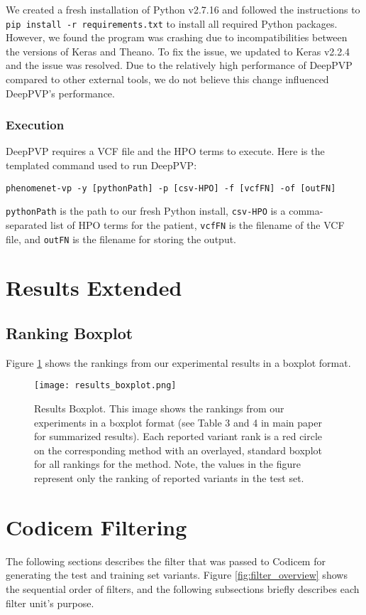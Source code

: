 \documentclass{article}
\begin{document}
We created a fresh installation of Python v2.7.16 and followed the instructions to \texttt{pip install -r requirements.txt} to install all required Python packages. However, we found the program was crashing due to incompatibilities between the versions of Keras and Theano.  To fix the issue, we updated to Keras v2.2.4 and the issue was resolved.  Due to the relatively high performance of DeepPVP compared to other external tools, we do not believe this change influenced DeepPVP's performance.

\subsubsection{Execution}
DeepPVP requires a VCF file and the HPO terms to execute.  Here is the templated command used to run DeepPVP:

\begin{verbatim}
phenomenet-vp -y [pythonPath] -p [csv-HPO] -f [vcfFN] -of [outFN]
\end{verbatim}

\texttt{pythonPath} is the path to our fresh Python install, \texttt{csv-HPO} is a comma-separated list of HPO terms for the patient, \texttt{vcfFN} is the filename of the VCF file, and \texttt{outFN} is the filename for storing the output.

\pagebreak
\section{Results Extended}
\subsection{Ranking Boxplot}
Figure \ref{fig:results_boxplot} shows the rankings from our experimental results in a boxplot format.

\begin{figure}[!b]
\centering
\texttt{[image: results\_boxplot.png]}
\caption{Results Boxplot. This image shows the rankings from our experiments in a boxplot format (see Table 3 and 4 in main paper for summarized results). Each reported variant rank is a red circle on the corresponding method with an overlayed, standard boxplot for all rankings for the method. Note, the values in the figure represent only the ranking of reported variants in the test set.}
\label{fig:results_boxplot}
\end{figure}

\pagebreak
\section{Codicem Filtering}
The following sections describes the filter that was passed to Codicem for generating the test and training set variants.  Figure \ref{fig:filter_overview} shows the sequential order of filters, and the following subsections briefly describes each filter unit's purpose.
\end{document}
